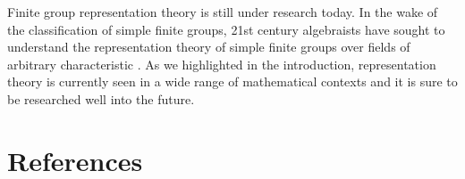 Finite group representation theory is still under research today. In the wake of the classification of simple finite groups, 21st century algebraists have sought to understand the representation theory of simple finite groups over fields of arbitrary characteristic \cite[page 1]{15}. As we highlighted in the introduction, representation theory is currently seen in a wide range of mathematical contexts and it is sure to be researched well into the future.\\

\newpage
\section{References}
\printbibliography[heading=none]

